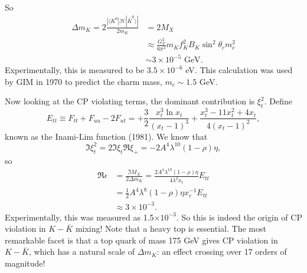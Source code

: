 So 
\begin{equation}
\begin{split}
\Delta m_K = 2\frac{|\langle K^0|\mathcal{H}|\bar{K}^0\rangle |}{2m_K}&= 2M_X \\ &\approx \frac{G_F^2}{6\pi^2}m_K f_K^2 B_K\sin^2\theta_c m_c^2 \\
&\sim 3\times 10^{-5} \text{ GeV}.
\end{split}
\end{equation}
Experimentally, this is measured to be $3.5 \times 10^{-6}$ eV. This calculation was used by GIM in 1970 to predict the charm mass, $m_c \sim 1.5$ GeV. 

Now looking at the CP violating terms, the dominant contribution is $\xi_t^2$. Define
\begin{equation}
E_{tt} \equiv F_{tt} + F_{uu} - 2F_{ut} = + \frac{3}{2} \frac{x_t^3 \ln x_t}{(x_t-1)^3} + \frac{x_t^3 - 11x_t^2 + 4x_t}{4(x_t-1)^2},
\end{equation}
known as the Inami-Lim function (1981). We know that
\begin{equation}
\Im \xi_t^2 = 2\Im \xi_t \Re \xi_+ = -2A^4 \lambda^{10}(1-\rho)\eta,
\end{equation}
so
\begin{equation}
\begin{split}
\Re \epsilon &= \frac{\Im M_X}{2 \Delta m_K} = \frac{2 A^4 \lambda^{10}(1-\rho)\eta}{4\lambda^2 x_t} E_{tt}\\
&= \frac{1}{2} A^4 \lambda^8 (1-\rho) \eta x_c^{-1} E_{tt} \\
&\approx 3\times 10^{-3}.
\end{split}
\end{equation}
Experimentally, this was measured as 1.5$\times 10^{-3}$. So this is indeed the origin of CP violation in $K-\bar{K}$ mixing! Note that a heavy top is essential. The most remarkable facet is that a top quark of mass 175 GeV gives CP violation in $K-\bar{K}$, which has a natural scale of $\Delta m_K$: an effect crossing over 17 orders of magnitude!
%
